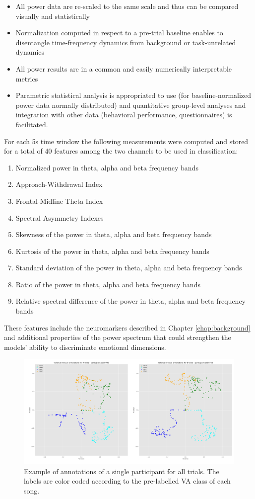 \begin{itemize}
\item 	All power data are re-scaled to the same scale and thus can be compared visually and statistically
\item 	Normalization computed in respect to a pre-trial baseline enables to disentangle time-frequency dynamics from background or task-unrelated dynamics
\item 	All power results are in a common and easily numerically interpretable metrics
\item 	Parametric statistical analysis is appropriated to use (for baseline-normalized power data normally distributed) and quantitative group-level analyses and integration with other data (behavioral performance, questionnaires) is facilitated. 
\end{itemize}
For each 5s time window the following measurements were computed and stored for a total of 40 features among the two channels to be used in classification:
\begin{enumerate}
\item 	Normalized power in theta, alpha and beta frequency bands
\item 	Approach-Withdrawal Index 
\item 	Frontal-Midline Theta Index
\item 	Spectral Asymmetry Indexes
\item 	Skewness of the power in theta, alpha and beta frequency bands
\item 	Kurtosis of the power in theta, alpha and beta frequency bands
\item     Standard deviation of the power in theta, alpha and beta frequency bands
\item 	Ratio of the power in theta, alpha and beta frequency bands
\item 	Relative spectral difference of the power in theta, alpha and beta frequency bands
\end{enumerate}

These features include the neuromarkers described in Chapter \ref{chap:background} and additional properties of the power spectrum that could strengthen the models’ ability to discriminate emotional dimensions. 

\begin{figure}[h!]
\includegraphics[width=15cm]{img/methods/example_avg_annotations.png}
\centering
\caption{Example of annotations of a single participant for all trials. The labels are color coded according to the pre-labelled VA class of each song.} \label{fig_avg_annotations}
\end{figure}

